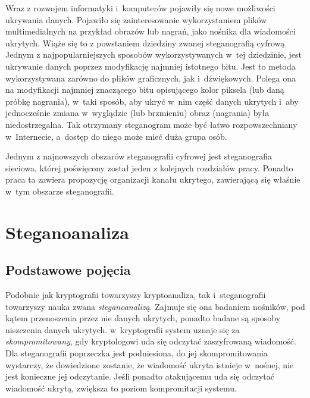 \documentclass[a4paper, twoside, 12pt]{report}
\begin{document}
        Wraz z rozwojem informatyki i~komputerów pojawiły się nowe możliwości
        ukrywania danych. Pojawiło się zainteresowanie wykorzystaniem plików
        multimedialnych na przykład obrazów lub nagrań, jako nośnika dla wiadomości
        ukrytych. Wiąże się to z powstaniem dziedziny zwanej steganografią cyfrową.
        Jednym z najpopularniejszych sposobów wykorzystywanych w~tej dziedzinie,
        jest ukrywanie danych poprzez modyfikację najmniej istotnego bitu. Jest
        to metoda wykorzystywana zarówno do plików graficznych\cite{LSBSTEGANGRAPHY},
        jak i~dźwiękowych\cite{AUDIOLSBSTEGANGRAPHY}.
        Polega ona na modyfikacji najmniej znaczącego bitu opisującego kolor piksela
        (lub daną próbkę nagrania), w~taki sposób, aby ukryć w~nim część danych
        ukrytych i~aby jednocześnie zmiana w~wyglądzie (lub brzmieniu) obraz (nagrania)
        była niedostrzegalna. Tak otrzymany steganogram może być łatwo rozpowszechniany
        w~Internecie, a~dostęp do niego może mieć duża grupa osób.

        Jednym z najnowszych obszarów steganografii cyfrowej jest steganografia
        sieciowa, której poświęcony został jeden z kolejnych rozdziałów pracy.
        Ponadto praca ta zawiera propozycję organizacji kanału ukrytego, zawierającą
        się właśnie w~tym obszarze steganografii.

    \section{Steganoanaliza}
        \subsection{Podstawowe pojęcia}
        Podobnie jak kryptografii towarzyszy kryptoanaliza, tak i~steganografii
        towarzyszy nauka zwana \emph{steganoanalizą}. Zajmuje się ona badaniem
        nośników, pod kątem przenoszenia przez nie danych ukrytych, ponadto badane
        są sposoby niszczenia danych ukrytych. w~kryptografii system uznaje się
        za \emph{skompromitowany}, gdy kryptologowi uda się odczytać zaszyfrowaną wiadomość.
        Dla steganografii poprzeczka jest podniesiona, do jej skompromitowania wystarczy,
        że dowiedzione zostanie, że wiadomość ukryta istnieje w~nośnej, nie jest
        konieczne jej odczytanie. Jeśli ponadto atakującemu uda się odczytać wiadomość
        ukrytą, zwiększa to poziom kompromitacji systemu.
\end{document}
